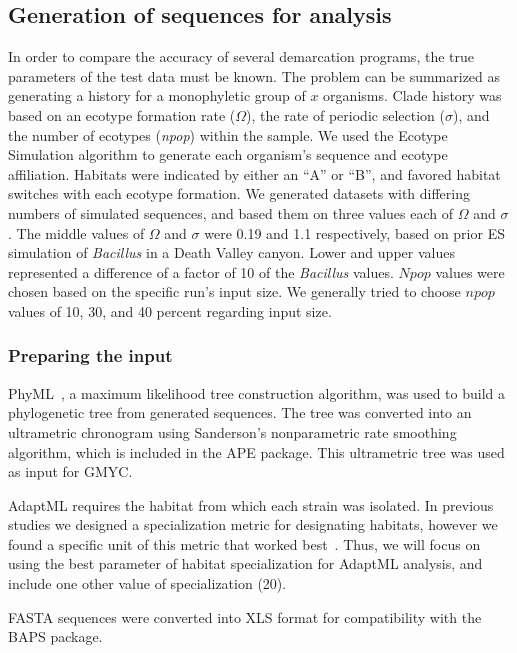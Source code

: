 \subsection*{Generation of sequences for analysis}
In order to compare the accuracy of several demarcation programs, the true parameters of the test data must be known.
The problem can be summarized as generating a history for a monophyletic group of $x$ organisms.
Clade history was based on an ecotype formation rate ($\Omega$), the rate of periodic selection ($\sigma$), and the number of ecotypes (\emph{npop}) within the sample.
We used the Ecotype Simulation algorithm to generate each organism's sequence and ecotype affiliation.
Habitats were indicated by either an ``A'' or ``B'', and favored habitat switches with each ecotype formation.
We generated datasets with differing numbers of simulated sequences, and based them on three values each of $\Omega$ and $\sigma$.
The middle values of $\Omega$ and $\sigma$ were 0.19 and 1.1 respectively, based on prior ES simulation of \emph{Bacillus} in a Death Valley canyon.
Lower and upper values represented a difference of a factor of 10 of the \emph{Bacillus} values.
$Npop$ values were chosen based on the specific run's input size.
We generally tried to choose $npop$ values of 10, 30, and 40 percent regarding input size.

\subsubsection*{Preparing the input}
PhyML~\cite{guindon2010new}, a maximum likelihood tree construction algorithm, was used to build a phylogenetic tree from generated sequences.
The tree was converted into an ultrametric chronogram using Sanderson's nonparametric rate smoothing algorithm, which is included in the APE package.
This ultrametric tree was used as input for GMYC.

AdaptML requires the habitat from which each strain was isolated.
In previous studies we designed a specialization metric for designating habitats, however we found a specific unit of this metric that worked best~\cite{carlo}.
Thus, we will focus on using the best parameter of habitat specialization for AdaptML analysis, and include one other value of specialization (20).

FASTA sequences were converted into XLS format for compatibility with the BAPS package.

